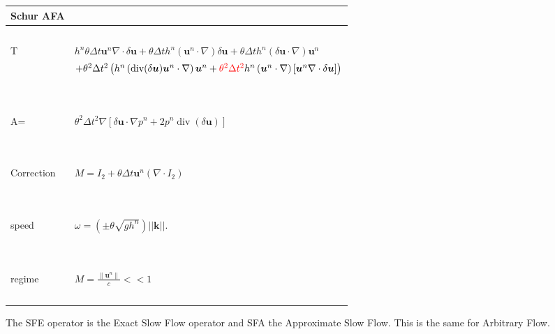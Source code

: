 \documentclass[a4paper, 11pt]{article}
\begin{document}
\begin{table}
\begin{tabular}{|l|l|}
  \hline
  Schur AFA &  \\
  \hline
  ~ & ~\\
  T &  $h^n\theta\Delta t\boldsymbol{u}^n\nabla \cdot \delta \boldsymbol{u}+\theta\Delta th^n\left(\boldsymbol{u}^n\cdot \nabla \right)\delta \boldsymbol{u}+\theta\Delta th^n\left(\delta \boldsymbol{u}\cdot \nabla\right)\boldsymbol{u}^n$\\
&$+\theta^2\Delta t^2 \left( h^n\left(\text{div}(\delta \boldsymbol{u})\boldsymbol{u}^n\cdot \nabla\right)\boldsymbol{u}^n+\textcolor{red}{\theta^2\Delta t^2}h^n\left(\boldsymbol{u}^n\cdot \nabla\right)\left[\boldsymbol{u}^n\nabla \cdot \delta \boldsymbol{u}\right]\right)$ \\ 
  ~ & ~\\
    \hline
   ~& ~\\ 
  A= & $\theta^2 \Delta t^2 \nabla\left[ \delta \boldsymbol{u}\cdot \nabla p^n + 2p^n \operatorname{div}(\delta \boldsymbol{u}) \right] $\\
  ~ & ~\\
      \hline
     ~ &~ \\
   Correction &  $M=I_2+\theta\Delta t\boldsymbol{u}^n(\nabla\cdot I_2)$ \\ 
   ~ & ~\\
    \hline
     ~ &~ \\
  speed & $\omega=\left(\pm\theta\sqrt{gh^n}\right)||\boldsymbol{k}||.$ \\ 
   ~ & ~\\
    \hline
    ~& ~\\
  regime & $M= \frac{\parallel \boldsymbol{u}^n \parallel }{c}<< 1$\\
   ~& ~\\
    \hline
\end{tabular}
\end{table}

The SFE operator is the Exact Slow Flow operator and SFA the Approximate Slow Flow. This is the same for Arbitrary Flow.
\end{document}
